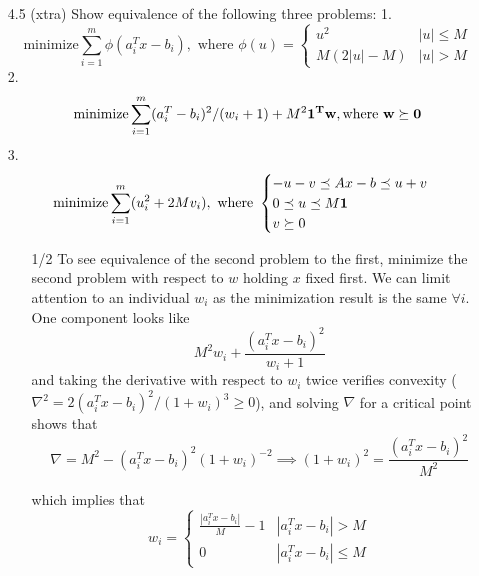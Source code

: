 \documentclass[12pt]{article}
\begin{document}
\begin{itemize}
\item[4.5 (xtra)] Show equivalence of the following three problems:
  1.
  $$
  \text{minimize} \sum_{i=1}^m \phi (a_i^Tx - b_i), \text{ where } \phi(u) = \begin{cases}
    u^2 & |u| \leq M \\
    M(2|u| - M) & |u| > M
  \end{cases}
  $$
  2.
  $$
  \text{minimize} \sum_{i=1}^m (a_i^T - b_i)^2 / (w_i + 1) + M^2\bf{1}^Tw, \text{where } w \succeq 0
  $$
  3.
  $$
  \text{minimize} \sum_{i=1}^m (u_i^2 + 2Mv_i), \text{ where } \begin{cases}
    -u - v \preceq Ax - b \preceq u + v \\
    0 \preceq u \preceq M \bf{1} \\
    v \succeq 0
  \end{cases}
  $$
  \begin{itemize}
    \item[1/2]
  To see equivalence of the second problem to the first, minimize the second problem with respect to $w$ holding $x$ fixed first. We can limit attention to an individual $w_i$ as the minimization result is the same $\forall i$.
  One component looks like
  $$M^2 w_i + \frac{(a_i^Tx - b_i)^2}{w_i + 1}$$
  and taking the derivative with respect to $w_i$ twice verifies convexity ($\nabla^2 = 2(a_i^Tx - b_i)^2 / (1+w_i)^3 \geq 0$), and solving $\nabla$ for a critical point shows that 
  $$\nabla = M^2 - (a_i^Tx - b_i)^2 (1+w_i)^{-2} \implies (1+w_i)^2 = \frac{(a_i^Tx - b_i)^2}{M^2}$$
 

  which implies that
  $$
  w_i = \begin{cases}
    \frac{|a_i^Tx - b_i|}{M} - 1 & |a_i^Tx - b_i| > M \\
    0 & |a_i^Tx - b_i| \leq M
    \end{cases}
  $$
  

\end{itemize}
\end{itemize}
\end{document}
